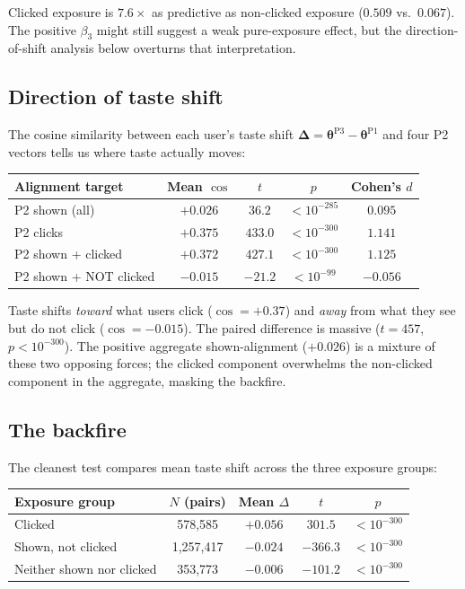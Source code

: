 \documentclass[11pt]{article}
\begin{document}
Clicked exposure is $7.6\times$ as predictive as non-clicked exposure ($0.509$ vs.\ $0.067$). The positive $\beta_3$ might still suggest a weak pure-exposure effect, but the direction-of-shift analysis below overturns that interpretation.

\subsection*{Direction of taste shift}

The cosine similarity between each user's taste shift $\boldsymbol{\Delta} = \boldsymbol{\theta}^{\text{P3}} - \boldsymbol{\theta}^{\text{P1}}$ and four P2 vectors tells us where taste actually moves:

\begin{center}
\begin{tabular}{lcccc}
\toprule
Alignment target & Mean $\cos$ & $t$ & $p$ & Cohen's $d$ \\
\midrule
P2 shown (all) & $+0.026$ & $36.2$ & $<10^{-285}$ & $0.095$ \\
P2 clicks & $+0.375$ & $433.0$ & $<10^{-300}$ & $1.141$ \\
P2 shown + clicked & $+0.372$ & $427.1$ & $<10^{-300}$ & $1.125$ \\
P2 shown + NOT clicked & $\mathbf{-0.015}$ & $-21.2$ & $<10^{-99}$ & $-0.056$ \\
\bottomrule
\end{tabular}
\end{center}

Taste shifts \emph{toward} what users click ($\cos = +0.37$) and \emph{away} from what they see but do not click ($\cos = -0.015$). The paired difference is massive ($t = 457$, $p < 10^{-300}$). The positive aggregate shown-alignment ($+0.026$) is a mixture of these two opposing forces; the clicked component overwhelms the non-clicked component in the aggregate, masking the backfire.

\subsection*{The backfire}

The cleanest test compares mean taste shift across the three exposure groups:

\begin{center}
\begin{tabular}{lcccc}
\toprule
Exposure group & $N$ (pairs) & Mean $\Delta$ & $t$ & $p$ \\
\midrule
Clicked & 578,585 & $+0.056$ & $301.5$ & $<10^{-300}$ \\
Shown, not clicked & 1,257,417 & $-0.024$ & $-366.3$ & $<10^{-300}$ \\
Neither shown nor clicked & 353,773 & $-0.006$ & $-101.2$ & $<10^{-300}$ \\
\bottomrule
\end{tabular}
\end{center}
\end{document}
